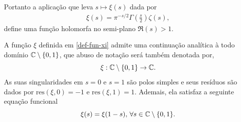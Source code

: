     Portanto a aplicação que leva 
    $s\longmapsto \xi(s)$ dada por
    \begin{align}
    \label{def-fun-xi}
    \xi(s) = \pi^{-s/2}\Gamma\left( \frac{s}{2} \right)\zeta(s),
    \end{align}
    define uma função holomorfa no semi-plano $\Re(s) > 1$.
    \begin{teorema}
    \label{teo-form-reflexao-xi}
        A função $\xi$ definida em \eqref{def-fun-xi}
        admite uma continuação analítica à todo domínio $\mathbb{C}\setminus\{0,1\}$,
        que abuso de notação será também denotada por, 
        \[\xi:\mathbb{C}\setminus\{0,1\}\to\mathbb{C}.\]
        As suas singularidades em $s=0$ e $s=1$
        são polos simples e seus resíduos são dados por $\mathrm{res}(\xi,0)=-1$ e $\mathrm{res}(\xi,1)=1$.
        Ademais, ela satisfaz
        a seguinte equação funcional
        \[
        \xi(s) = \xi(1-s), \, \forall s\in\mathbb{C}\setminus\{0,1\}.
        \]
    \end{teorema}
